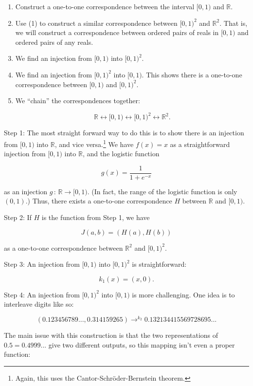 \documentclass[../key.tex]{subfiles}
\begin{document}
\begin{enumerate}
\item Construct a one-to-one correspondence between the interval $[0,1)$ and $\mathbb{R}$.
\item Use (1) to construct a similar correspondence between $[0,1)^2$ and $\mathbb{R}^2$. That is, we will construct a correspondence between ordered pairs of reals in $[0,1)$ and ordered pairs of any reals.
\item We find an injection from $[0,1)$ into $[0,1)^2$.
\item We find an injection from $[0,1)^2$ into $[0,1)$. This shows there is a one-to-one correspondence between $[0,1)$ and $[0,1)^2$.
\item We ``chain'' the correspondences together:

$$\mathbb{R} \leftrightarrow [0,1) \leftrightarrow [0,1)^2 \leftrightarrow \mathbb{R}^2.$$
\end{enumerate}

\noindent Step 1: The most straight forward way to do this is to show there is an injection from $[0,1)$ into $\mathbb{R}$, and vice versa.\footnote{Again, this uses the Cantor-Schröder-Bernstein theorem.} We have $f(x)=x$ as a straightforward injection from $[0,1)$ into $\mathbb{R}$, and the logistic function

$$g(x)=\frac{1}{1+e^{-x}}$$

\noindent as an injection $g\, : \, \mathbb{R} \to [0,1)$. (In fact, the range of the logistic function is only $(0,1)$.) Thus, there exists a one-to-one correspondence $H$ between $\mathbb{R}$ and $[0,1)$.

Step 2: If $H$ is the function from Step 1, we have

$$J(a,b)=(H(a),H(b))$$

\noindent as a one-to-one correspondence between $\mathbb{R}^2$ and $[0,1)^2$.

\noindent Step 3: An injection from $[0,1)$ into $[0,1)^2$ is straightforward:

$$k_1(x)=(x, 0).$$

\noindent Step 4: An injection from $[0,1)^2$ into $[0,1)$ is more challenging. One idea is to interleave digits like so:

$$(0.123456789..., 0.314159265)\mathop{\to} ^ {k_2} 0.132134415569728695...$$

\noindent The main issue with this construction is that the two representations of $0.5=0.4999...$ give two different outputs, so this mapping isn't even a proper function:
\end{document}
